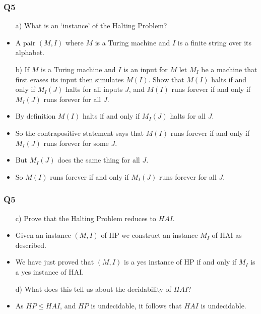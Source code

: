 \documentclass[handout]{beamer}
\begin{document}
\begin{frame}
\frametitle{Q5}
\begin{enumerate}
\item[a)] What is an `instance' of the Halting Problem?
\end{enumerate}
\begin{itemize}
\item A pair $(M,I)$ where $M$ is a Turing machine and $I$ is a finite string over its alphabet.
\end{itemize}
\begin{enumerate}
\item[b)] If $M$ is a Turing machine and $I$ is an input for $M$ let $M_I$ be a machine that first erases its input then simulates $M(I)$. Show that $M(I)$ halts if and only if $M_I(J)$ halts for all inputs $J$, and $M(I)$ runs forever if and only if $M_I(J)$ runs forever for all $J$.\vspace{0.3cm}
\end{enumerate}
\begin{itemize}
\item By definition $M(I)$ halts if and only if $M_I(J)$ halts for all $J$. 
\item So the contrapositive statement says that $M(I)$ runs forever if and only if $M_I(J)$ runs forever for some $J$. 
\item But $M_I(J)$ does the same thing for all $J$. 
\item So $M(I)$ runs forever if and only if $M_I(J)$ runs forever for all $J$.
\end{itemize}
\end{frame}

\begin{frame}
\frametitle{Q5}
\begin{enumerate}
\item[c)] Prove that the Halting Problem reduces to $HAI$.
\end{enumerate}
\begin{itemize}
\item Given an instance $(M,I)$ of HP we construct an instance $M_I$ of HAI as described. 
\item We have just proved that $(M,I)$ is a yes instance of HP if and only if $M_I$ is a yes instance of HAI.
\end{itemize}
\vspace{0.5cm}
\begin{enumerate}
\item[d)] What does this tell us about the decidability of $HAI$?
\end{enumerate}
\begin{itemize}
\item As $HP\leq HAI$, and $HP$ is undecidable, it follows that $HAI$ is undecidable.
\end{itemize}

\end{frame}
\end{document}
